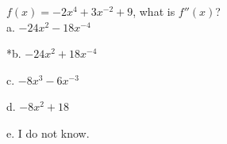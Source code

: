 
\( f(x) = -2x^{4} + 3x^{-2} + 9 \), what is
\( f''(x) \)?\\

a. \( -24x^{2} - 18x^{-4} \)

*b. \( -24x^{2} + 18x^{-4} \)

c. \( -8x^{3} - 6x^{-3} \) 

d. \( -8x^{2} + 18 \) 

e. I do not know.\\
